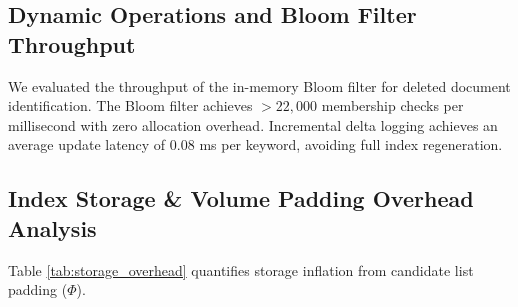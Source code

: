 \documentclass[runningheads]{llncs}
\begin{document}
\begin{table}[H]
\centering
\caption{Multi-Device Search Query Latency Evaluation ($N = 10,000$ Keywords).}
\label{tab:multi_latency}
\end{table}

\subsection{Dynamic Operations and Bloom Filter Throughput}
We evaluated the throughput of the in-memory Bloom filter for deleted document identification. The Bloom filter achieves $> 22,000$ membership checks per millisecond with zero allocation overhead. Incremental delta logging achieves an average update latency of $0.08$ ms per keyword, avoiding full index regeneration.

\subsection{Index Storage \& Volume Padding Overhead Analysis}
Table \ref{tab:storage_overhead} quantifies storage inflation from candidate list padding ($\Phi$).

\begin{table}[H]
\centering
\caption{Index Storage Inflation under Power-of-Two Volume Padding ($\Phi$).}
\label{tab:storage_overhead}
\end{table}
\end{document}
